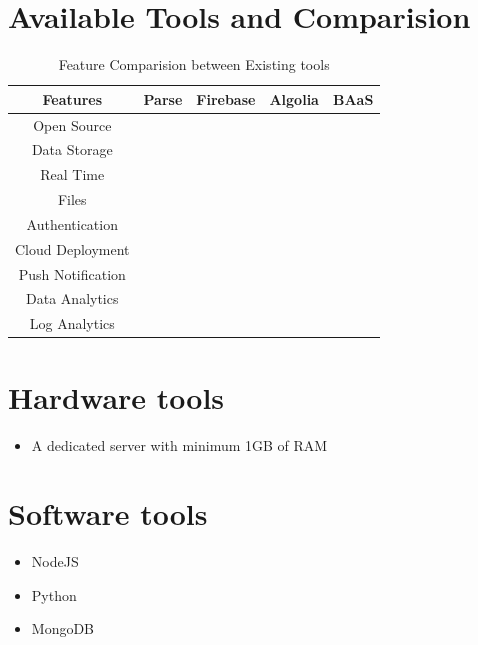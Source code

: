 \documentclass[a4paper,12pt]{report}
\newcommand{\cmark}{\ding{51}}
\newcommand{\xmark}{\ding{55}}
\begin{document}
    \newpage
    \section{Available Tools and Comparision}
    \begin{table}[h!]
      \centering
      \caption{Feature Comparision between Existing tools}
      \begin{tabular}{ |c|c|c|c|c| } 
      \hline
      Features & Parse & Firebase & Algolia & BAaS\\
      \hline
      Open Source & \cmark & \xmark & \xmark & \cmark \\ 
      Data Storage & \cmark & \cmark & \cmark & \cmark \\  
      Real Time & \xmark & \cmark & \xmark & \cmark \\ 
      Files & \cmark & \xmark & \xmark & \cmark \\ 
      Authentication & \cmark & \cmark & \xmark & \cmark \\ 
      Cloud Deployment & \xmark & \xmark & \xmark & \cmark \\ 
      Push Notification & \cmark & \xmark & \xmark & \cmark \\
      Data Analytics & \xmark & \xmark & \xmark & \cmark \\ 
      Log Analytics & \xmark & \cmark & \xmark & \cmark \\ 
      \hline
      \end{tabular}
      
      \label{table:1}
    \end{table}
   
    \section{Hardware tools}    
    \begin{itemize}
    \item A dedicated server with minimum 1GB of RAM
    \end{itemize}

    \section{Software tools}    
    \begin{itemize}
    \item NodeJS     
    \item Python
    \item MongoDB
    \end{itemize}
            
\end{document}
